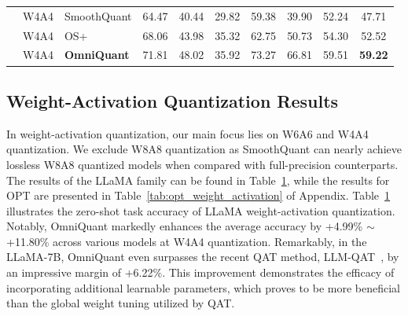 \documentclass{article} %
\begin{document}
\begin{table}[t]
\begin{tabular}{lllccccccc}
        & W4A4 & SmoothQuant & 64.47 & 40.44 & 29.82 & 59.38 & 39.90 & 52.24 & 47.71 \\
        & W4A4 & OS+ & 68.06 & 43.98 & 35.32 & 62.75 & 50.73 & 54.30 & 52.52 \\
        & \cellcolor{Gray}W4A4 & \cellcolor{Gray}\textbf{OmniQuant} & \cellcolor{Gray}71.81 & \cellcolor{Gray}48.02 & \cellcolor{Gray}35.92 & \cellcolor{Gray}73.27 & \cellcolor{Gray}66.81 & \cellcolor{Gray}59.51 & \cellcolor{Gray}\textbf{59.22} \\
        \hline
    \end{tabular}
    \label{tab:llama_weight_activation}
    \vspace{-1em}
\end{table}



\subsection{Weight-Activation Quantization Results}
In weight-activation quantization, our main focus lies on W6A6 and W4A4 quantization. We exclude W8A8 quantization as SmoothQuant can nearly achieve lossless W8A8 quantized models when compared with full-precision counterparts.
%
The results of the LLaMA family can be found in Table~\ref{tab:llama_weight_activation}, while the results for OPT are presented in Table~\ref{tab:opt_weight_activation} of Appendix. 
%
Table~\ref{tab:llama_weight_activation} illustrates the zero-shot task accuracy of LLaMA weight-activation quantization. Notably, OmniQuant markedly enhances the average accuracy by +4.99\% $ \sim $  +11.80\% across various models at W4A4 quantization.
%
Remarkably, in the  LLaMA-7B, OmniQuant even surpasses the recent QAT method, LLM-QAT~\citep{llmqat}, by an impressive margin of +6.22\%. This improvement demonstrates the efficacy of incorporating additional learnable parameters, which proves to be more beneficial than the global weight tuning utilized by QAT.
%



%
\end{document}

